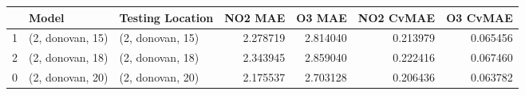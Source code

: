\begin{tabular}{lllrrrr}
\toprule
{} &             Model &  Testing Location &   NO2 MAE &    O3 MAE &  NO2 CvMAE &  O3 CvMAE \\
\midrule
1 &  (2, donovan, 15) &  (2, donovan, 15) &  2.278719 &  2.814040 &   0.213979 &  0.065456 \\
2 &  (2, donovan, 18) &  (2, donovan, 18) &  2.343945 &  2.859040 &   0.222416 &  0.067460 \\
0 &  (2, donovan, 20) &  (2, donovan, 20) &  2.175537 &  2.703128 &   0.206436 &  0.063782 \\
\bottomrule
\end{tabular}
